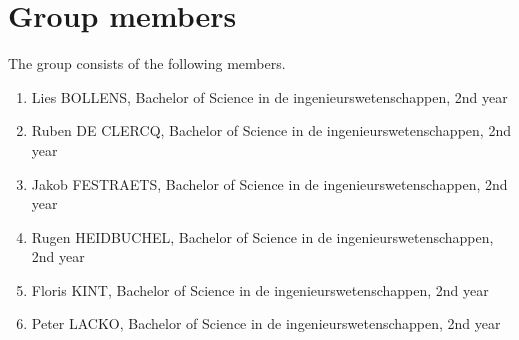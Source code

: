 \section{Group members}
The group consists of the following members.
\begin{enumerate}
 \item Lies BOLLENS, Bachelor of Science in de ingenieurswetenschappen, 2nd year
 \item Ruben DE CLERCQ, Bachelor of Science in de ingenieurswetenschappen, 2nd year
 \item Jakob FESTRAETS, Bachelor of Science in de ingenieurswetenschappen, 2nd year
 \item Rugen HEIDBUCHEL, Bachelor of Science in de ingenieurswetenschappen, 2nd year
 \item Floris KINT, Bachelor of Science in de ingenieurswetenschappen, 2nd year
 \item Peter LACKO, Bachelor of Science in de ingenieurswetenschappen, 2nd year
\end{enumerate}
